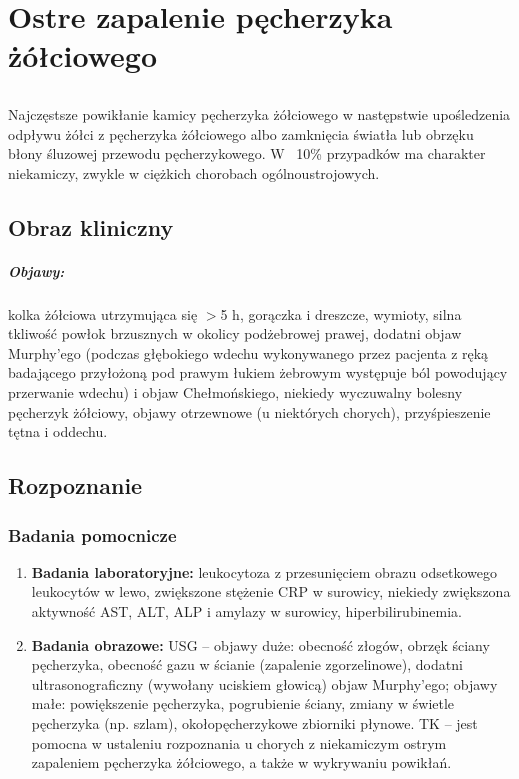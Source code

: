
\chapter{Ostre zapalenie pęcherzyka żółciowego}

\section{\DiEtp}

Najczęstsze powikłanie kamicy pęcherzyka żółciowego w następstwie upośledzenia odpływu żółci z pęcherzyka żółciowego albo zamknięcia światła lub obrzęku błony śluzowej przewodu pęcherzykowego. 
W ~10\% przypadków ma charakter niekamiczy, zwykle w ciężkich chorobach ogólnoustrojowych.

\section{Obraz kliniczny}

\paragraph{Objawy:}
kolka żółciowa utrzymująca się $>$5 h, gorączka i dreszcze, wymioty, silna tkliwość powłok brzusznych w okolicy podżebrowej prawej, dodatni objaw Murphy’ego (podczas głębokiego wdechu wykonywanego przez pacjenta z ręką badającego przyłożoną pod prawym łukiem żebrowym występuje ból powodujący przerwanie wdechu) i objaw Chełmońskiego, niekiedy wyczuwalny bolesny pęcherzyk żółciowy, objawy otrzewnowe (u niektórych chorych), przyśpieszenie tętna i oddechu.

\section{Rozpoznanie}

\subsection{Badania pomocnicze}

\begin{enumerate}
    \item\textbf{ Badania laboratoryjne:} leukocytoza z przesunięciem obrazu odsetkowego leukocytów w lewo, zwiększone stężenie CRP w surowicy, niekiedy zwiększona aktywność AST, ALT, ALP i amylazy w surowicy, hiperbilirubinemia.

    \item \textbf{Badania obrazowe:} USG – objawy duże: obecność złogów, obrzęk ściany pęcherzyka, obecność gazu w ścianie (zapalenie zgorzelinowe), dodatni ultrasonograficzny (wywołany uciskiem głowicą) objaw Murphy’ego; objawy małe: powiększenie pęcherzyka, pogrubienie ściany, zmiany w świetle pęcherzyka (np. szlam), okołopęcherzykowe zbiorniki płynowe. 
    TK – jest pomocna w ustaleniu rozpoznania u chorych z niekamiczym ostrym zapaleniem pęcherzyka żółciowego, a także w wykrywaniu powikłań.
\end{enumerate}

